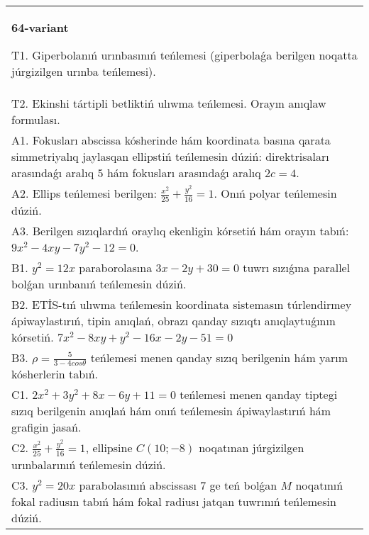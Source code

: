 \documentclass{article}
\begin{document}
\begin{tabular}{m{17cm}}
\textbf{64-variant}
\newline

T1. Giperbolanıń urınbasınıń teńlemesi (giperbolaǵa berilgen noqatta júrgizilgen urınba teńlemesi).\\

T2. Ekinshi tártipli betliktiń ulıwma teńlemesi. Orayın anıqlaw formulası.\\

A1. Fokusları abscissa kósherinde hám koordinata basına qarata simmetriyalıq jaylasqan ellipstiń teńlemesin dúziń: direktrisaları arasındaǵı aralıq $5$ hám fokusları arasındaǵı aralıq $2 c=4$.\\

A2. Ellips teńlemesi berilgen: $\frac{x^2}{25}+\frac{y^2}{16}=1$. Onıń polyar teńlemesin dúziń.\\

A3. Berilgen sızıqlardıń oraylıq ekenligin kórsetiń hám orayın tabıń: $9 x^{2}-4 xy-7 y^{2}-12=0$.\\

B1. $y^{2} = 12x$ paraborolasına $3x - 2y + 30 = 0$ tuwrı sızıǵına parallel bolǵan urınbanıń teńlemesin dúziń.  \\

B2. ETİS-tıń ulıwma teńlemesin koordinata sistemasın túrlendirmey ápiwaylastırıń, tipin anıqlań, obrazı qanday sızıqtı anıqlaytuǵının kórsetiń. $7x^{2} - 8xy + y^{2} - 16x - 2y - 51 = 0$  \\

B3. $\rho = \frac{5}{3 - 4cos\theta}$ teńlemesi menen qanday sızıq berilgenin hám yarım kósherlerin tabıń.  \\

C1. $2x^{2} + 3y^{2} + 8x - 6y + 11 = 0$ teńlemesi menen qanday tiptegi sızıq berilgenin anıqlań hám onıń teńlemesin ápiwaylastırıń hám grafigin jasań.  \\

C2. $\frac{x^{2}}{25} + \frac{y^{2}}{16} = 1$, ellipsine $C(10; - 8)$ noqatınan júrgizilgen urınbalarınıń teńlemesin dúziń.  \\

C3. $y^{2} = 20x$ parabolasınıń abscissası 7 ge teń bolǵan $M$ noqatınıń fokal radiusın tabıń hám fokal radiusı jatqan tuwrınıń teńlemesin dúziń.  \\

\end{tabular}
\vspace{1cm}
\end{document}
